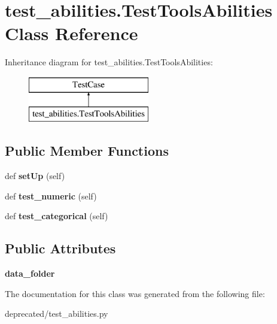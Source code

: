 \hypertarget{classtest__abilities_1_1_test_tools_abilities}{}\section{test\+\_\+abilities.\+Test\+Tools\+Abilities Class Reference}
\label{classtest__abilities_1_1_test_tools_abilities}
Inheritance diagram for test\+\_\+abilities.\+Test\+Tools\+Abilities\+:\begin{figure}[H]
\begin{center}
\leavevmode
\includegraphics[height=2.000000cm]{classtest__abilities_1_1_test_tools_abilities}
\end{center}
\end{figure}
\subsection*{Public Member Functions}
\begin{DoxyCompactItemize}
\item 
def {\bfseries set\+Up} (self)\hypertarget{classtest__abilities_1_1_test_tools_abilities_a5241ad737650b495e3a3753a900db47f}{}\label{classtest__abilities_1_1_test_tools_abilities_a5241ad737650b495e3a3753a900db47f}

\item 
def {\bfseries test\+\_\+numeric} (self)\hypertarget{classtest__abilities_1_1_test_tools_abilities_a4f2a227cfb70263ccaf5015942e02a30}{}\label{classtest__abilities_1_1_test_tools_abilities_a4f2a227cfb70263ccaf5015942e02a30}

\item 
def {\bfseries test\+\_\+categorical} (self)\hypertarget{classtest__abilities_1_1_test_tools_abilities_a04c4ff9cfd0b78060f582ea122a6ade3}{}\label{classtest__abilities_1_1_test_tools_abilities_a04c4ff9cfd0b78060f582ea122a6ade3}

\end{DoxyCompactItemize}
\subsection*{Public Attributes}
\begin{DoxyCompactItemize}
\item 
{\bfseries data\+\_\+folder}\hypertarget{classtest__abilities_1_1_test_tools_abilities_a4c152c7433c0021e28ab194a6912b2cc}{}\label{classtest__abilities_1_1_test_tools_abilities_a4c152c7433c0021e28ab194a6912b2cc}

\end{DoxyCompactItemize}


The documentation for this class was generated from the following file\+:\begin{DoxyCompactItemize}
\item 
deprecated/test\+\_\+abilities.\+py\end{DoxyCompactItemize}
